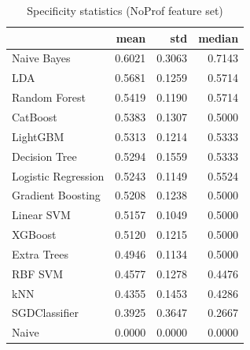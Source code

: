 \begin{table}
\caption{Specificity statistics (NoProf feature set)}
\label{tab:specificity_NoProf_stats}
\begin{tabular}{lrrr}
\toprule
 & mean & std & median \\
\midrule
Naive Bayes & 0.6021 & 0.3063 & 0.7143 \\
LDA & 0.5681 & 0.1259 & 0.5714 \\
Random Forest & 0.5419 & 0.1190 & 0.5714 \\
CatBoost & 0.5383 & 0.1307 & 0.5000 \\
LightGBM & 0.5313 & 0.1214 & 0.5333 \\
Decision Tree & 0.5294 & 0.1559 & 0.5333 \\
Logistic Regression & 0.5243 & 0.1149 & 0.5524 \\
Gradient Boosting & 0.5208 & 0.1238 & 0.5000 \\
Linear SVM & 0.5157 & 0.1049 & 0.5000 \\
XGBoost & 0.5120 & 0.1215 & 0.5000 \\
Extra Trees & 0.4946 & 0.1134 & 0.5000 \\
RBF SVM & 0.4577 & 0.1278 & 0.4476 \\
kNN & 0.4355 & 0.1453 & 0.4286 \\
SGDClassifier & 0.3925 & 0.3647 & 0.2667 \\
Naive & 0.0000 & 0.0000 & 0.0000 \\
\bottomrule
\end{tabular}
\end{table}
